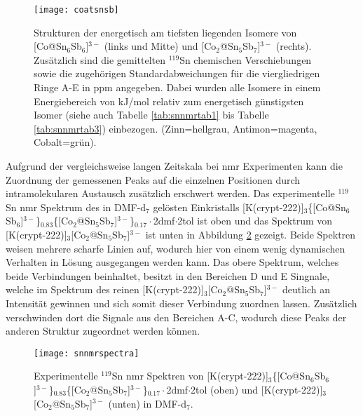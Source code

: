 \begin{figure}[ht!]
	\centering
	\texttt{[image: coatsnsb]}
	\captionsetup{figurewithin = chapter}
	\captionsetup{font=small, labelfont=bf}\caption[Strukturen von {[Co@Sn$_6$Sb$_6$]$^{3-}$ und [Co$_2$@Sn$_5$Sb$_7$]$^{3-}$}]{Strukturen der energetisch am tiefsten liegenden Isomere von [Co@Sn$_6$Sb$_6$]$^{3-}$ (links und Mitte) und [Co$_2$@Sn$_5$Sb$_7$]$^{3-}$ (rechts). Zusätzlich sind die gemittelten $^{119}$Sn chemischen Verschiebungen sowie die zugehörigen Standardabweichungen für die viergliedrigen Ringe A-E in ppm angegeben. Dabei wurden alle Isomere in einem Energiebereich von \unit[10]{kJ/mol} relativ zum energetisch günstigsten Isomer (siehe auch Tabelle \ref{tab:snnmrtab1} bis Tabelle \ref{tab:snnmrtab3}) einbezogen. (Zinn=hellgrau, Antimon=magenta, Cobalt=grün).}
\label{abb:coatsnsb}
\end{figure}
\FloatBarrier
Aufgrund der vergleichsweise langen Zeitskala bei \ac{nmr} Experimenten kann die Zuordnung der gemessenen Peaks auf die einzelnen Positionen durch intramolekularen Austausch zusätzlich erschwert werden. Das experimentelle $^{119}$Sn \ac{nmr} Spektrum des in DMF-d$_7$ gelösten Einkristalls [K(crypt-222)]$_3$\{[Co@Sn$_6$Sb$_6$]$^{3-}$\}$_{0.83}$\{[Co$_2$@Sn$_5$Sb$_7$]$^{3-}$\}$_{0.17}\cdot$2dmf$\cdot$2tol ist oben und das Spektrum von [K(crypt-222)]$_3$[Co$_2$@Sn$_5$Sb$_7$]$^{3-}$ ist unten in Abbildung \ref{abb:expsnnmr} gezeigt. Beide Spektren weisen mehrere scharfe Linien auf, wodurch hier von einem wenig dynamischen Verhalten in Lösung ausgegangen werden kann. Das obere Spektrum, welches beide Verbindungen beinhaltet, besitzt in den Bereichen D und E Singnale, welche im Spektrum des reinen [K(crypt-222)]$_3$[Co$_2$@Sn$_5$Sb$_7$]$^{3-}$ deutlich an Intensität gewinnen und sich somit dieser Verbindung zuordnen lassen. Zusätzlich verschwinden dort die Signale aus den Bereichen A-C, wodurch diese Peaks der anderen Struktur zugeordnet werden können. 
\begin{figure}[ht!]
	\centering
	\texttt{[image: snnmrspectra]}
	\captionsetup{figurewithin = chapter}
	\captionsetup{font=small, labelfont=bf}\caption[{$^{119}$Sn \ac{nmr} Spektren von [Co@Sn$_6$Sb$_6$]$^{3-}$ und [Co$_2$@Sn$_5$Sb$_7$]$^{3-}$}]{Experimentelle $^{119}$Sn \ac{nmr} Spektren von [K(crypt-222)]$_3$\{[Co@Sn$_6$Sb$_6$]$^{3-}$\}$_{0.83}$\{[Co$_2$@Sn$_5$Sb$_7$]$^{3-}$\}$_{0.17}\cdot$2dmf$\cdot$2tol (oben) und [K(crypt-222)]$_3$[Co$_2$@Sn$_5$Sb$_7$]$^{3-}$ (unten) in DMF-d$_7$.}
\label{abb:expsnnmr}
\end{figure}
\FloatBarrier

